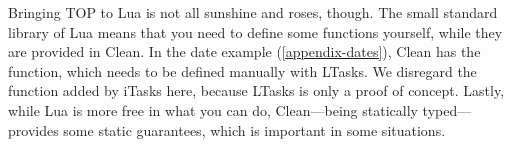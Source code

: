 Bringing TOP to Lua is not all sunshine and roses, though. The small standard library of Lua means that you need to define some functions yourself, while they are provided in Clean. In the date example (\ref{appendix-dates}), Clean has the  function, which needs to be defined manually with LTasks. We disregard the  function added by iTasks here, because LTasks is only a proof of concept. Lastly, while Lua is more free in what you can do, Clean---being statically typed---provides some static guarantees, which is important in some situations.
